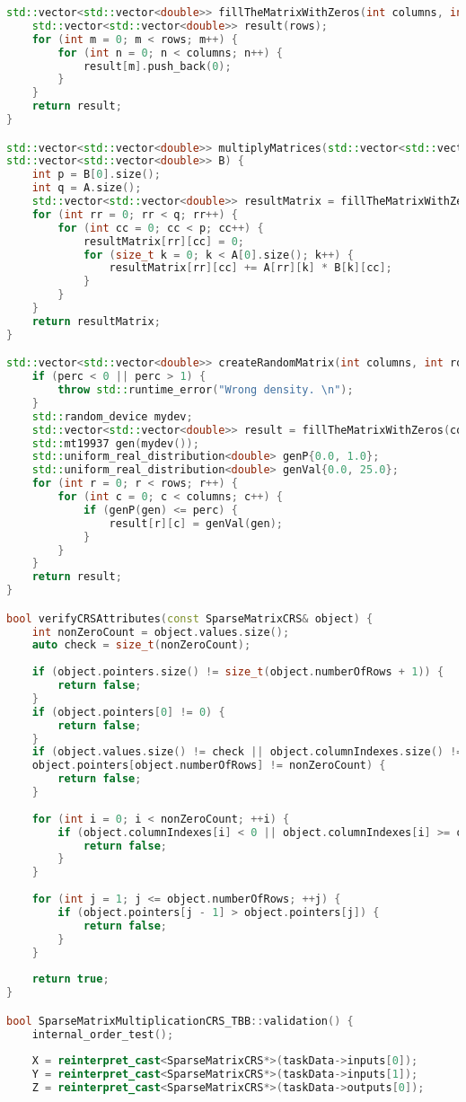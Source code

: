 \documentclass[a4paper, 14pt]{article}
\newcommand{\n}{\par}
\theoremstyle{plain}
\begin{document}
\begin{lstlisting}[language=C++,caption=Файл sparse\_matmult\_crs\_tbb.cpp]
std::vector<std::vector<double>> fillTheMatrixWithZeros(int columns, int rows) {
	std::vector<std::vector<double>> result(rows);
	for (int m = 0; m < rows; m++) {
		for (int n = 0; n < columns; n++) {
			result[m].push_back(0);
		}
	}
	return result;
}

std::vector<std::vector<double>> multiplyMatrices(std::vector<std::vector<double>> A,
std::vector<std::vector<double>> B) {
	int p = B[0].size();
	int q = A.size();
	std::vector<std::vector<double>> resultMatrix = fillTheMatrixWithZeros(p, q);
	for (int rr = 0; rr < q; rr++) {
		for (int cc = 0; cc < p; cc++) {
			resultMatrix[rr][cc] = 0;
			for (size_t k = 0; k < A[0].size(); k++) {
				resultMatrix[rr][cc] += A[rr][k] * B[k][cc];
			}
		}
	}
	return resultMatrix;
}

std::vector<std::vector<double>> createRandomMatrix(int columns, int rows, double perc) {
	if (perc < 0 || perc > 1) {
		throw std::runtime_error("Wrong density. \n");
	}
	std::random_device mydev;
	std::vector<std::vector<double>> result = fillTheMatrixWithZeros(columns, rows);
	std::mt19937 gen(mydev());
	std::uniform_real_distribution<double> genP{0.0, 1.0};
	std::uniform_real_distribution<double> genVal{0.0, 25.0};
	for (int r = 0; r < rows; r++) {
		for (int c = 0; c < columns; c++) {
			if (genP(gen) <= perc) {
				result[r][c] = genVal(gen);
			}
		}
	}
	return result;
}

bool verifyCRSAttributes(const SparseMatrixCRS& object) {
	int nonZeroCount = object.values.size();
	auto check = size_t(nonZeroCount);
	
	if (object.pointers.size() != size_t(object.numberOfRows + 1)) {
		return false;
	}
	if (object.pointers[0] != 0) {
		return false;
	}
	if (object.values.size() != check || object.columnIndexes.size() != check ||
	object.pointers[object.numberOfRows] != nonZeroCount) {
		return false;
	}
	
	for (int i = 0; i < nonZeroCount; ++i) {
		if (object.columnIndexes[i] < 0 || object.columnIndexes[i] >= object.numberOfColumns) {
			return false;
		}
	}
	
	for (int j = 1; j <= object.numberOfRows; ++j) {
		if (object.pointers[j - 1] > object.pointers[j]) {
			return false;
		}
	}
	
	return true;
}

bool SparseMatrixMultiplicationCRS_TBB::validation() {
	internal_order_test();
	
	X = reinterpret_cast<SparseMatrixCRS*>(taskData->inputs[0]);
	Y = reinterpret_cast<SparseMatrixCRS*>(taskData->inputs[1]);
	Z = reinterpret_cast<SparseMatrixCRS*>(taskData->outputs[0]);
	

\end{lstlisting}
\end{document}
